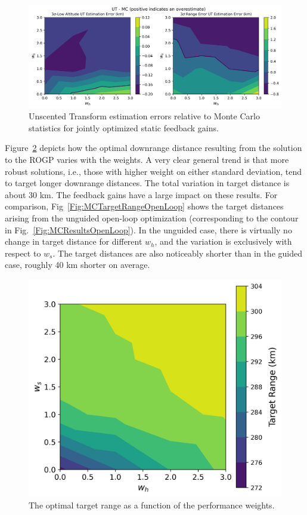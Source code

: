 \begin{figure}[h!]
	\centering
	\includegraphics[width=1\textwidth]{Images/Reoptimized_WeightSweepError}
	\caption{Unscented Transform estimation errors relative to Monte Carlo statistics for jointly optimized static feedback gains.}
	\label{Fig:MCErrorsOptGain}
\end{figure}
Figure~\ref{Fig:MCTargetRange} depicts how the optimal downrange distance resulting from the solution to the ROGP varies with the weights. A very clear general trend is that more robust solutions, i.e., those with higher weight on either standard deviation, tend to target longer downrange distances. The total variation in target distance is about 30 km. The feedback gains have a large impact on these results. For comparison, Fig~\ref{Fig:MCTargetRangeOpenLoop} shows the target distances arising from the unguided open-loop optimization (corresponding to the contour in Fig.~\ref{Fig:MCResultsOpenLoop}). In the unguided case, there is virtually no change in target distance for different $w_h$, and the variation is exclusively with respect to $w_s$. The target distances are also noticeably shorter than in the guided case, roughly 40 km shorter on average.  
\begin{figure}[h!]
	\centering
	\includegraphics[width=1\textwidth]{Images/MSL_TargetRange}
	\caption{The optimal target range as a function of the performance weights.}
	\label{Fig:MCTargetRange}
\end{figure}
